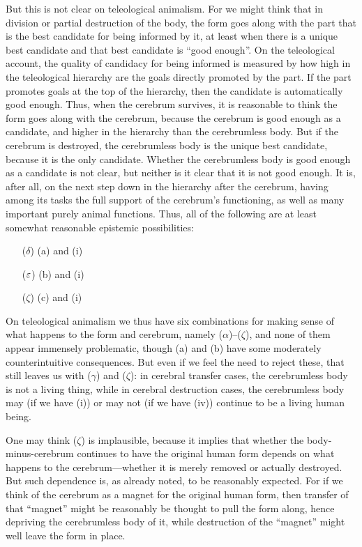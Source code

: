 But this is not clear on teleological animalism. For we might think that in division or partial destruction of the body, the form 
goes along with the part that is the best candidate for being informed by it, at least when there is a unique best candidate and that best 
candidate is ``good enough''. On the teleological account, the quality of candidacy for being informed is measured by how high in the teleological hierarchy are
the goals directly promoted by the part. If the part promotes goals at the top of the hierarchy, then the candidate is automatically
good enough. Thus, when the cerebrum survives, it is reasonable to think the form goes along with the cerebrum, because the cerebrum
is good enough as a candidate, and higher in the hierarchy than the cerebrumless body. But if the cerebrum is destroyed, the cerebrumless
body is the unique best candidate, because it is the only candidate. Whether the cerebrumless body is good enough as a candidate is not clear, but neither is it
clear that it is not good enough. It is, after all, on the next step down in the hierarchy after the cerebrum, having among its tasks the full
support of the cerebrum's functioning, as well as many important purely animal functions. Thus, all of the following are at least somewhat reasonable 
epistemic possibilities:
\begin{itemize}
\item[($\delta$)] (a) and (i)
\item[($\varepsilon$)] (b) and (i)
\item[($\zeta$)] (c) and (i)
\end{itemize}

On teleological animalism we thus have six combinations for making sense of what happens to the form and cerebrum, namely ($\alpha$)--($\zeta$), 
and none of them appear immensely problematic, though (a) and (b) have some moderately counterintuitive consequences. But even if we feel
the need to reject these, that still leaves us with ($\gamma$) and ($\zeta$): in cerebral transfer cases, the cerebrumless body is not a living
thing, while in cerebral destruction cases, the cerebrumless body may (if we have (i)) or may not (if we have (iv)) continue to be a living
human being. 

One may think ($\zeta$) is implausible, because it implies that whether the body-minus-cerebrum continues to have the original human
form depends on what happens to the cerebrum---whether it is merely removed or actually destroyed. But such dependence is, as already
noted, to be reasonably expected. For if we think of the cerebrum as a magnet for the original human form, then transfer of that ``magnet''
might be reasonably be thought to pull the form along, hence depriving the cerebrumless body of it, while destruction of the ``magnet'' might
well leave the form in place. 

